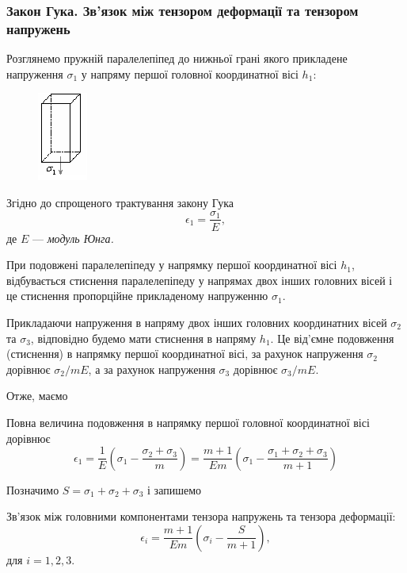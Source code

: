 \subsubsection{Закон Гука. Зв'язок між тензором деформації та тензором напружень}

Розглянемо пружній паралелепіпед до нижньої грані якого прикладене напруження $\sigma_1$ у напряму першої головної координатної вісі $h_1$:
\begin{figure}[H]
	\centering
	\includegraphics[]{img/9-1.png}
\end{figure}

Згідно до спрощеного трактування закону Гука  
\begin{equation}
	\epsilon_1 = \frac{\sigma_1}{E},
\end{equation}
де $E$ --- \it{модуль Юнга}. \medskip

При подовжені паралелепіпеду у напрямку першої координатної вісі $h_1$, відбувається стиснення паралелепіпеду у напрямах двох інших головних вісей і це стиснення пропорційне прикладеному напруженню $\sigma_1$. \medskip

Прикладаючи напруження в напряму двох інших головних координатних вісей $\sigma_2$ та $\sigma_3$, відповідно будемо мати стиснення в напряму $h_1$. Це від'ємне подовження (стиснення) в напрямку першої координатної вісі, за рахунок напруження $\sigma_2$ дорівнює $\sigma_2 / m E$, а за рахунок напруження $\sigma_3$ дорівнює $\sigma_3 / m E$. \medskip

Отже, маємо 
\begin{law}
	Повна величина подовження в напрямку першої головної координатної вісі дорівнює
	\begin{equation}
		\epsilon_1 = \frac{1}{E} \left( \sigma_1 - \frac{\sigma_2 + \sigma_3}{m} \right) = \frac{m + 1}{E m} \left( \sigma_1 - \frac{\sigma_1 + \sigma_2 + \sigma_3}{m + 1} \right)
	\end{equation}
\end{law}

Позначимо $S = \sigma_1 + \sigma_2 + \sigma_3$ і запишемо 
\begin{law}[Гука]
	Зв'язок між головними компонентами тензора напружень та тензора деформації:
	\begin{equation}
		\epsilon_i = \frac{m + 1}{E m} \left( \sigma_i - \frac{S}{m + 1} \right),
	\end{equation}
	для $i = 1, 2, 3$.
\end{law}

